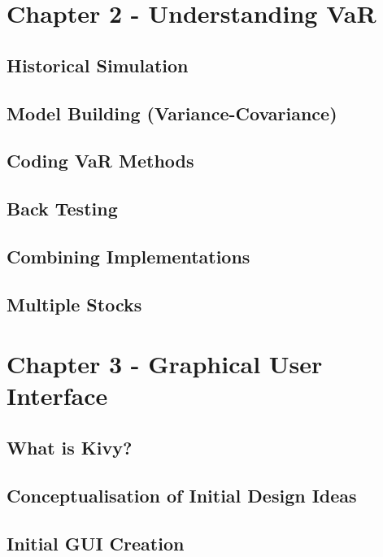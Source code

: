 \documentclass{article}
\begin{document}
\section{Chapter 2 - Understanding VaR}

\subsection{Historical Simulation}

\subsection{Model Building (Variance-Covariance)}

\subsection{Coding VaR Methods}

\subsection{Back Testing}

\subsection{Combining Implementations}

\subsection{Multiple Stocks}


\section{Chapter 3 - Graphical User Interface}

\subsection{What is Kivy?}

\subsection{Conceptualisation of Initial Design Ideas}

\subsection{Initial GUI Creation}
\end{document}
